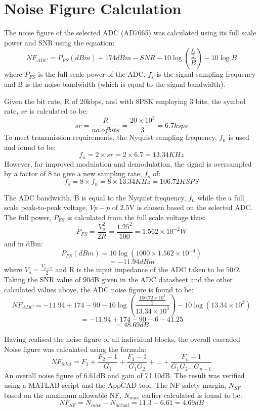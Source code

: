 \section{Noise Figure Calculation}

The noise figure of the selected ADC (AD7665) was calculated using its full scale power and SNR using the equation:
	\[	NF_{ADC} = P_{FS}(dBm) + 174dBm - SNR - 10 \log \left( \frac{\frac{f_{s}}{2}}{B} \right) - 10 \log B  \]
	where \(P_{FS}\) is the full scale power of the ADC, \(f_{s}\) is the signal sampling frequency and B is the noise bandwidth (which is equal to the signal bandwidth).

Given the bit rate, R of 20kbps, and with 8PSK employing 3 bits, the symbol rate, \(sr\) is calculated to be:
	\[ sr = \frac{R}{no. of bits} = \frac{20 \times 10^{3}}{ 3 } = 6.7 ksps  \]
To meet transmission requirements, the Nyquist sampling frequency, \(f_{n}\) is used and found to be:
	\[ f_{n} = 2 \times sr = 2 \times 6.7 = 13.34 KHz\]
However, for improved modulation and demodulation, the signal is oversampled by a factor of 8 to give a new sampling rate, \(f_{s}\) of:
	\[ f_{s} = 8 \times f_{n} = 8 \times 13.34KHz = 106.72KSPS\]

The ADC bandwidth, B is equal to the Nyquist frequency, \(f_{n}\) while the a full scale peak-to-peak voltage, \(V{p-p}\) of 2.5V is chosen based on the selected ADC.  The full power, \(P_{FS}\) is calculated from the full scale voltage thus:
	\[ P_{FS} = \frac{V^{2}_{o}}{2R} = \frac{1.25^2}{100} = 1.562 \times 10^{-2} W \]
and in dBm:
	\[ P_{FS}(dBm) = 10 \log \left( 1000 \times 1.562 \times 10^{-4} \right) \]
	\[ 			   = -11.94dBm	\]
where \(V_{o} = \frac{V_{p-p}}{2}\) and R is the input impedance of the ADC taken to be \(50\Omega\).
Taking the SNR value of 90dB given in the ADC datasheet and the other calculated values above, the ADC noise figure is found to be:
	\[ NF_{ADC} = -11.94 + 174 - 90 - 10 \log \left( \frac{\frac{106.72 \times 10^{3}}{2}}{13.34 \times 10^{3}} \right) - 10 \log (13.34 \times 10^{3}) \]
	\[ 		    = -11.94 + 174 - 90 - 6 - 41.25\]
	\[  		= 48.69dB \]
	
Having realised the noise figure of all individual blocks, the overall cascaded Noise figure was calculated using the formula:
	\[ NF_{total} = F_{1} + \frac{F_{2} - 1}{G_{1}} + \frac{F_{3} - 1}{G_{1}G_{2}} + ... +\frac{F_{n} - 1}{G_{1}G_{2}...G_{n-1}} \]
An overall noise figure of  6.61dB and gain of 71.10dB.  The result was verified using a MATLAB script and the AppCAD tool.  The NF safety margin, \(N_{SF}\) based on the maximum allowable NF, \(N_{max}\) earlier calculated is found to be:  
	\[ NF_{SF} = N_{max} - N_{actual} = 11.3 - 6.61 = 4.69dB	\]


